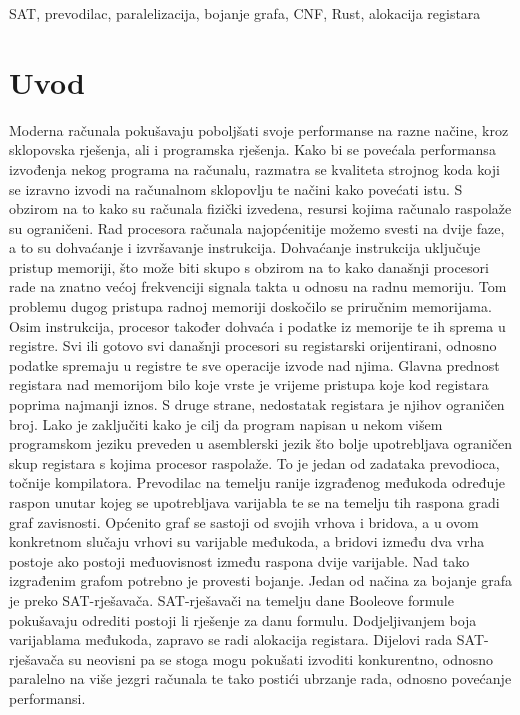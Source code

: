 \documentclass[hidelinks, conference]{IEEEtran}
\begin{document}
\begin{IEEEkeywords}
SAT, prevodilac, paralelizacija, bojanje grafa, CNF, Rust, alokacija registara
\end{IEEEkeywords}

\section{Uvod}
Moderna računala pokušavaju poboljšati svoje performanse na razne načine, kroz sklopovska rješenja, ali i programska rješenja. Kako bi se povećala performansa izvođenja nekog programa na računalu, razmatra se kvaliteta strojnog koda koji se izravno izvodi na računalnom sklopovlju te načini kako povećati istu. S obzirom na to kako su računala fizički izvedena, resursi kojima računalo raspolaže su ograničeni. Rad procesora računala najopćenitije možemo svesti na dvije faze, a to su dohvaćanje i izvršavanje instrukcija. Dohvaćanje instrukcija uključuje pristup memoriji, što može biti skupo s obzirom na to kako današnji procesori rade na znatno većoj frekvenciji signala takta u odnosu na radnu memoriju. Tom problemu dugog pristupa radnoj memoriji doskočilo se priručnim memorijama. Osim instrukcija, procesor također dohvaća i podatke iz memorije te ih sprema u registre. Svi ili gotovo svi današnji procesori su registarski orijentirani, odnosno podatke spremaju u registre te sve operacije izvode nad njima. Glavna prednost registara nad memorijom bilo koje vrste je vrijeme pristupa koje kod registara poprima najmanji iznos. S druge strane, nedostatak registara je njihov ograničen broj. Lako je zaključiti kako je cilj da program napisan u nekom višem programskom jeziku preveden u asemblerski jezik što bolje upotrebljava ograničen skup registara s kojima procesor raspolaže. To je jedan od zadataka prevodioca, točnije kompilatora. Prevodilac na temelju ranije izgrađenog međukoda određuje raspon unutar kojeg se upotrebljava varijabla te se na temelju tih raspona gradi graf zavisnosti. Općenito graf se sastoji od svojih vrhova i bridova, a u ovom konkretnom slučaju vrhovi su varijable međukoda, a bridovi između dva vrha postoje ako postoji međuovisnost između raspona dvije varijable. Nad tako izgrađenim grafom potrebno je provesti bojanje. Jedan od načina za bojanje grafa je preko SAT-rješavača. SAT-rješavači na temelju dane Booleove formule pokušavaju odrediti postoji li rješenje za danu formulu. Dodjeljivanjem boja varijablama međukoda, zapravo se radi alokacija registara. Dijelovi rada SAT-rješavača su neovisni pa se stoga mogu pokušati izvoditi konkurentno, odnosno paralelno na više jezgri računala te tako postići ubrzanje rada, odnosno povećanje performansi.
\end{document}
